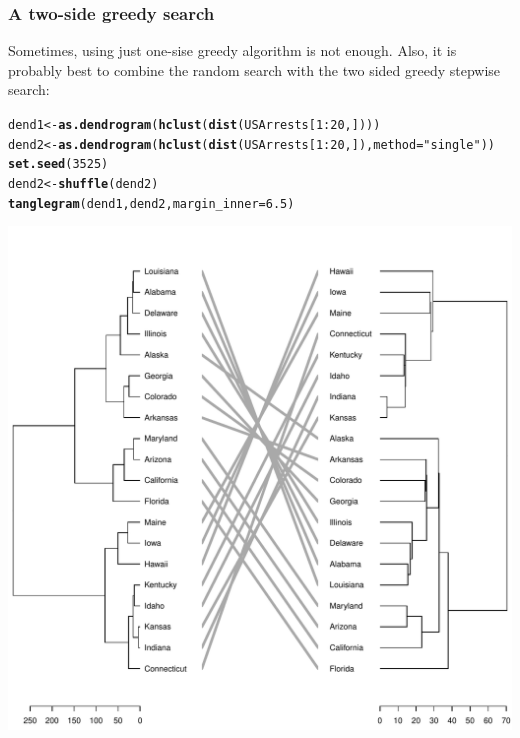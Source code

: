\documentclass[shortnames,nojss,article]{jss}\usepackage[]{graphicx}\usepackage[]{color}
\makeatletter
\def\maxwidth{ %
  \ifdim\Gin@nat@width>\linewidth
    \linewidth
  \else
    \Gin@nat@width
  \fi
}
\newcommand{\hlnum}[1]{\textcolor[rgb]{0.686,0.059,0.569}{#1}}%
\newcommand{\hlstr}[1]{\textcolor[rgb]{0.192,0.494,0.8}{#1}}%
\newcommand{\hlopt}[1]{\textcolor[rgb]{0,0,0}{#1}}%
\newcommand{\hlstd}[1]{\textcolor[rgb]{0.345,0.345,0.345}{#1}}%
\newcommand{\hlkwb}[1]{\textcolor[rgb]{0.69,0.353,0.396}{#1}}%
\newcommand{\hlkwc}[1]{\textcolor[rgb]{0.333,0.667,0.333}{#1}}%
\newcommand{\hlkwd}[1]{\textcolor[rgb]{0.737,0.353,0.396}{\textbf{#1}}}%
\newenvironment{kframe}{%
 \def\at@end@of@kframe{}%
 \ifinner\ifhmode%
  \def\at@end@of@kframe{\end{minipage}}%
  \begin{minipage}{\columnwidth}%
 \fi\fi%
 \def\FrameCommand##1{\hskip\@totalleftmargin \hskip-\fboxsep
 \colorbox{shadecolor}{##1}\hskip-\fboxsep
     \hskip-\linewidth \hskip-\@totalleftmargin \hskip\columnwidth}%
 \MakeFramed {\advance\hsize-\width
   \@totalleftmargin\z@ \linewidth\hsize
   \@setminipage}}%
 {\par\unskip\endMakeFramed%
 \at@end@of@kframe}
\newenvironment{knitrout}{}{} %
\makeatother
\begin{document}
\subsubsection{A two-side greedy search}

Sometimes, using just one-sise greedy algorithm is not enough. Also, it is probably best to combine the random search with the two sided greedy stepwise search:

\begin{knitrout}
\color{fgcolor}\begin{kframe}
\begin{alltt}
\hlstd{dend1} \hlkwb{<-} \hlkwd{as.dendrogram}\hlstd{(}\hlkwd{hclust}\hlstd{(}\hlkwd{dist}\hlstd{(USArrests[}\hlnum{1}\hlopt{:}\hlnum{20}\hlstd{, ])))}
\hlstd{dend2} \hlkwb{<-} \hlkwd{as.dendrogram}\hlstd{(}\hlkwd{hclust}\hlstd{(}\hlkwd{dist}\hlstd{(USArrests[}\hlnum{1}\hlopt{:}\hlnum{20}\hlstd{, ]),} \hlkwc{method} \hlstd{=} \hlstr{"single"}\hlstd{))}
\hlkwd{set.seed}\hlstd{(}\hlnum{3525}\hlstd{)}
\hlstd{dend2} \hlkwb{<-} \hlkwd{shuffle}\hlstd{(dend2)}
\hlkwd{tanglegram}\hlstd{(dend1, dend2,} \hlkwc{margin_inner} \hlstd{=} \hlnum{6.5}\hlstd{)}
\end{alltt}
\end{kframe}

{\centering \includegraphics[width=\maxwidth]{figure/unnamed-chunk-401} 

}
\end{knitrout}
\end{document}
